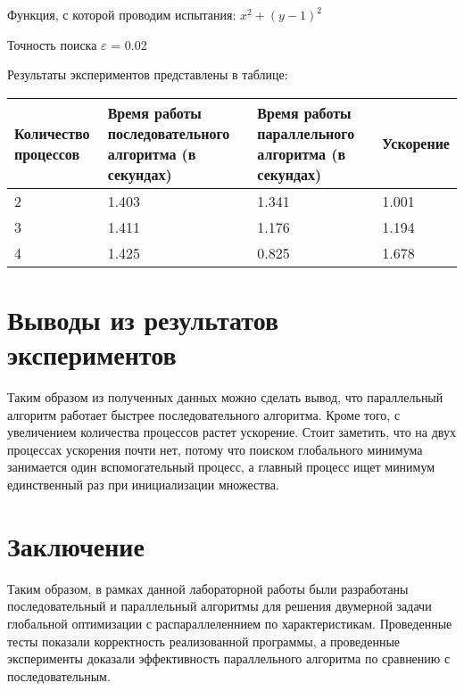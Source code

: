 \documentclass{report}
\begin{document}
\par Функция, с которой проводим испытания: $x^2 + (y - 1)^2$

\par Точность поиска $\varepsilon$  = 0.02 

\par Результаты экспериментов представлены в таблице:

\begin{table}[!h]
\centering
\begin{tabular}{| p{2cm} | p{3cm} | p{4cm} | p{2cm} |}
\hline
Количество процессов & Время работы последовательного алгоритма (в секундах) & Время работы параллельного алгоритма (в секундах) & Ускорение \\[5pt]
\hline
2 & 1.403 & 1.341 & 1.001 \\
3 & 1.411 & 1.176 & 1.194 \\
4 & 1.425 & 0.825 & 1.678 \\
\hline
\end{tabular}
\end{table}
\newpage

\section*{Выводы из результатов экспериментов}
Таким образом из полученных данных можно сделать вывод, что параллельный алгоритм работает быстрее последовательного алгоритма. Кроме того, с увеличением количества процессов растет ускорение. Стоит заметить, что на двух процессах ускорения почти нет, потому что поиском глобального минимума занимается один вспомогательный процесс, а главный процесс ищет минимум единственный раз при инициализации множества.
\newpage

\section*{Заключение}
Таким образом, в рамках данной лабораторной работы были разработаны последовательный и параллельный алгоритмы для решения двумерной задачи глобальной оптимизации с распараллеленнием по характеристикам. Проведенные тесты показали корректность реализованной программы, а проведенные эксперименты доказали эффективность параллельного алгоритма по сравнению с последовательным.

\newpage
\end{document}
